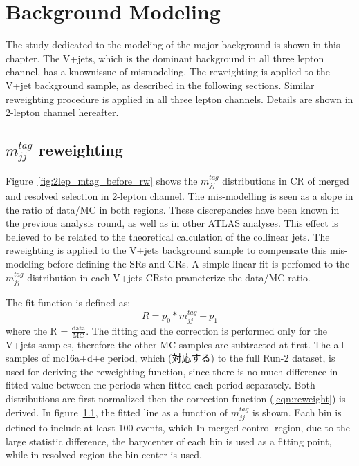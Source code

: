 \chapter{Background Modeling}
\label{chap:modeling}

The study dedicated to the modeling of the major background is shown in this chapter.
The V+jets, which is the dominant background in all three lepton channel, has a knownissue of mismodeling. 
The reweighting is applied to the V+jet background sample, as described in the following sections.
Similar reweighting procedure is applied in all three lepton channels. Details are shown in 2-lepton channel hereafter.

\section{$m_{jj}^{tag}$ reweighting}
Figure~\ref{fig:2lep_mtag_before_rw} shows the $m^{tag}_{jj}$ distributions in CR of merged and resolved selection in 2-lepton channel.
The mis-modelling is seen as a slope in the ratio of data/MC in both regions.
These discrepancies have been known in the previous analysis round, as well as in other ATLAS analyses. 
This effect is believed to be related to the theoretical calculation of the collinear jets.
The reweighting is applied to the V+jets background sample to compensate this mis-modeling before defining the SRs and CRs. 
A simple linear fit is perfomed to the $m^{tag}_{jj}$ distribution in each V+jets CRsto prameterize the data/MC ratio. 

The fit function is defined as:
\begin{equation}
\label{eqn:reweight}
R=p_{0} * m_{jj}^{tag}+p_{1}
\end{equation}
where the R = $\frac{\mathrm{data}}{\mathrm{MC}}$. 
The fitting and the correction is performed only for the V+jets samples, therefore the other MC samples are subtracted at first. 
The all samples of mc16a+d+e period, which (対応する) to the full Run-2 dataset, is used for deriving the reweighting function, since there is no much difference in fitted value between mc periods when fitted each period separately. 
Both distributions are first normalized then the correction function (\ref{eqn:reweight}) is derived. 
In figure~\ref{}, the fitted line as a function of $m^{tag}_{jj}$ is shown. 
Each bin is defined to include at least 100 events, which 
In merged control region, due to the large statistic difference, the barycenter of each bin is used as a fitting point, while in resolved region the bin center is used.

